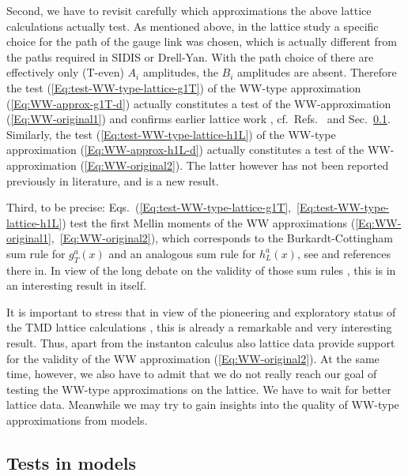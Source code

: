 \documentclass[a4paper,11pt]{article}
\begin{document}
Second, we have to revisit carefully which approximations the above
lattice calculations actually test. As mentioned above, in
the lattice study \cite{Hagler:2009mb,Musch:2010ka} a specific choice for
the path of the gauge link was chosen, which is actually different
from the paths required in SIDIS or Drell-Yan. With the path choice of
\cite{Hagler:2009mb,Musch:2010ka} there are effectively only (T-even)
$A_i$ amplitudes, the $B_i$ amplitudes are absent.
Therefore the test (\ref{Eq:test-WW-type-lattice-g1T}) of the WW-type
approximation (\ref{Eq:WW-approx-g1T-d}) actually constitutes a test
of the WW-approximation (\ref{Eq:WW-original1}) and confirms
earlier lattice work \cite{Gockeler:2000ja,Gockeler:2005vw},
cf.\ Refs.~\cite{Metz:2008ib,Teckentrup:2009tk} and
Sec.~\ref{Sec-3.6:models}.
Similarly, the test (\ref{Eq:test-WW-type-lattice-h1L}) of the
WW-type approximation (\ref{Eq:WW-approx-h1L-d}) actually constitutes
a test of the WW-approximation (\ref{Eq:WW-original2}). The latter
however has not been reported previously in literature, and is a
new result.

Third, to be precise:
Eqs.~(\ref{Eq:test-WW-type-lattice-g1T},~\ref{Eq:test-WW-type-lattice-h1L})
test the first Mellin moments of the WW approximations
(\ref{Eq:WW-original1},~\ref{Eq:WW-original2}), which corresponds to the
Burkardt-Cottingham sum rule for $g_T^a(x)$ and an analogous sum rule for
$h_L^a(x)$, see \cite{Jaffe:1996zw} and references there in.
In view of the long debate on the validity of those sum rules
\cite{Burkardt:2001iy,Bass:2003vp,Efremov:2002qh}, this is in
an interesting result in itself.

It is important to stress that in view of the pioneering and
exploratory status of the TMD lattice calculations
\cite{Hagler:2009mb,Musch:2010ka}, this is already a remarkable and very
interesting result. Thus, apart from the instanton calculus
\cite{Dressler:1999hc} also lattice data provide support for
the validity of the WW approximation (\ref{Eq:WW-original2}).
At the same time, however, we also have to admit that we do
not really reach our goal of testing the WW-type approximations
on the lattice. We have to wait for better lattice data. 
Meanwhile we may try to gain insights into the quality of
WW-type approximations from models.




\subsection{Tests in models}
\label{Sec-3.6:models}
\end{document}
